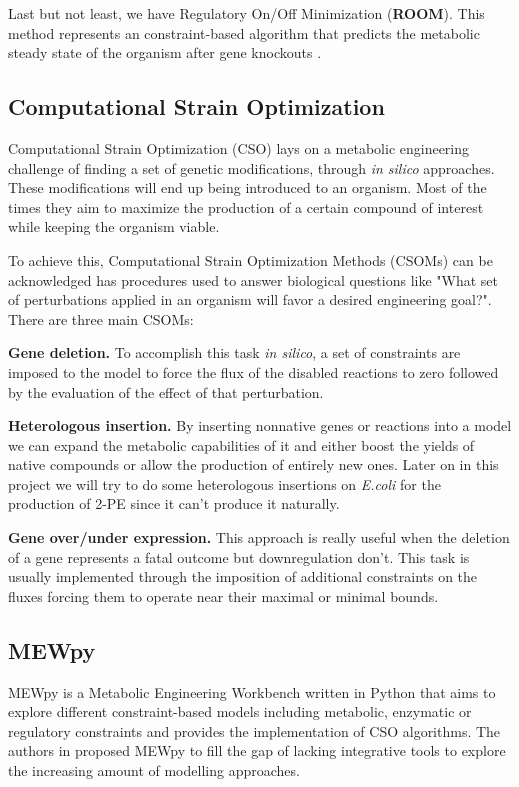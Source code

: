 \documentclass[runningheads]{llncs}
\begin{document}
Last but not least, we have Regulatory On/Off Minimization (\textbf{ROOM}). This method represents an constraint-based algorithm that predicts the metabolic steady state of the organism after gene knockouts \cite{shlomi2005regulatory}.


\subsection{Computational Strain Optimization}
Computational Strain Optimization (CSO) lays on a metabolic engineering challenge of finding a set of genetic modifications, through \emph{in silico} approaches. These modifications will end up being introduced to an organism. Most of the times they aim to maximize the production of a certain compound of interest while keeping the organism viable.

To achieve this, Computational Strain Optimization Methods (CSOMs) can be acknowledged has procedures used to answer biological questions like "What set of perturbations applied in an organism will favor a desired engineering goal?". There are three main CSOMs:

\textbf{Gene deletion.} To accomplish this task \emph{in silico}, a set of constraints are imposed to the model to force the flux of the disabled reactions to zero followed by the evaluation of the effect of that perturbation.

\textbf{Heterologous insertion.} By inserting nonnative genes or reactions into a model we can expand the metabolic capabilities of it and either boost the yields of native compounds or allow the production of entirely new ones. Later on in this project we will try to do some heterologous insertions on \emph{E.coli} for the production of 2-PE since it can't produce it naturally.

\textbf{Gene over/under expression.} This approach is really useful when the deletion of a gene represents a fatal outcome but downregulation don't. This task is usually implemented through the imposition of additional constraints on the fluxes forcing them to operate near their maximal or minimal bounds. \cite{maia2016silico}

\subsection{MEWpy}
MEWpy \cite{pereira2021mewpy} is a Metabolic Engineering Workbench written in Python that aims to explore different constraint-based models including metabolic, enzymatic or regulatory constraints and provides the implementation of CSO algorithms. The authors in \cite{pereira2021mewpy} proposed MEWpy to fill the gap of lacking integrative tools to explore the increasing amount of modelling approaches.
\end{document}
